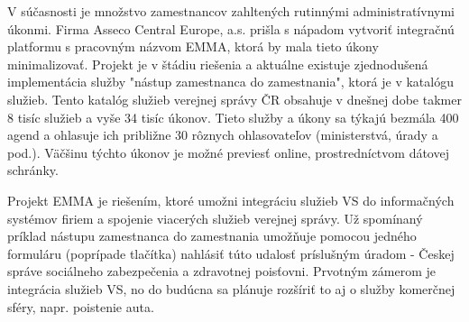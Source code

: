 %


\startthesis
\startbodymatter

V súčasnosti je množstvo zamestnancov zahltených rutinnými administratívnymi úkonmi. Firma Asseco Central Europe, a.s. prišla s nápadom vytvoriť integračnú platformu s pracovným názvom EMMA, ktorá by mala tieto úkony minimalizovať. Projekt je v štádiu riešenia a aktuálne existuje zjednodušená implementácia služby "nástup zamestnanca do zamestnania", ktorá je v katalógu služieb. Tento katalóg služieb verejnej správy ČR obsahuje v dnešnej dobe takmer 8 tisíc služieb a vyše 34 tisíc úkonov.  Tieto služby a úkony sa týkajú bezmála 400 agend a ohlasuje ich približne 30 rôznych ohlasovateľov (ministerstvá, úrady a pod.). Väčšinu týchto úkonov je možné previesť online, prostredníctvom dátovej schránky. 

Projekt EMMA je riešením, ktoré umožni integráciu služieb VS do informačných systémov firiem a spojenie viacerých služieb verejnej správy. Už spomínaný príklad nástupu zamestnanca do zamestnania umožňuje pomocou jedného formuláru (poprípade tlačítka) nahlásiť túto udalosť príslušným úradom - Českej správe sociálneho zabezpečenia a zdravotnej poisťovni. Prvotným zámerom je integrácia služieb VS, no do budúcna sa plánuje rozšíriť to aj o služby komerčnej sféry, napr. poistenie auta. 


